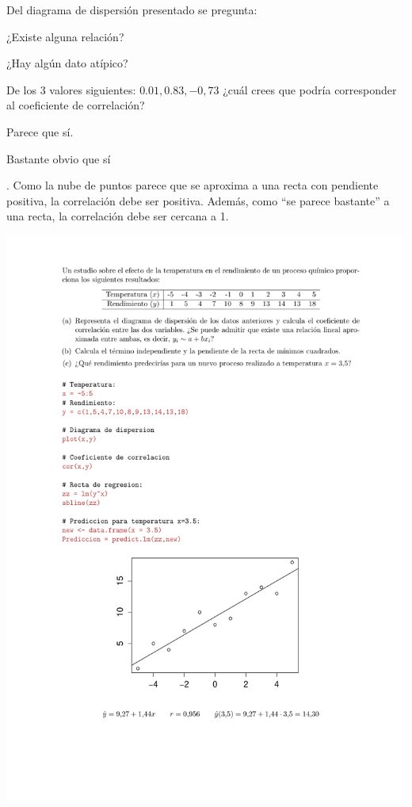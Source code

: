 \begin{problem}[8]
Del diagrama de dispersión presentado se pregunta:

\ppart ¿Existe alguna relación?

\ppart ¿Hay algún dato atípico?

\ppart De los 3 valores siguientes: $0.01, 0.83, -0,73$ ¿cuál crees que podría corresponder al coeficiente de correlación?

\solution

\spart Parece que sí.

\spart Bastante obvio que sí

. Como la nube de puntos parece que se aproxima a una recta con pendiente positiva, la correlación debe ser positiva. Además, como ``se parece bastante'' a una recta, la correlación debe ser cercana a 1.

\end{problem}


\newpage
\begin{problem}[9]
\solution
\centerline{\includegraphics[page=1,scale=0.78]{pdf/_Solucion_T1P9.pdf}} %
\end{problem}
\newpage


